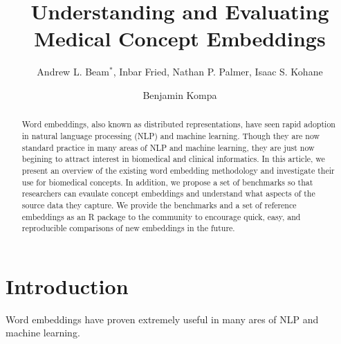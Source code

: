 \documentclass{ws-procs11x85}
\begin{document}
\title{Understanding and Evaluating Medical Concept Embeddings}

\author{Andrew L. Beam$^*$, Inbar Fried, Nathan P. Palmer, Isaac S. Kohane}

\address{Department of Biomedical Informatics, Harvard Medical School,\\
Boston, MA, 02115, USA\\
$^*$E-mail: Andrew\_Beam@hms.harvard.edu\\
www.university\_name.edu}

\author{Benjamin Kompa}

\address{University of North Carolina, Chapel Hill,\\
Chapel Hill, NC, 27514, USA\\
E-mail: kompa@live.unc.edu}

\begin{abstract}
Word embeddings, also known as distributed representations, have seen rapid adoption in natural language processing (NLP) and machine learning. Though they are now standard practice in many areas of NLP and machine learning, they are just now begining to attract interest in biomedical and clinical informatics. In this article, we present an overview of the existing word embedding methodology and investigate their use for biomedical concepts. In addition, we propose a set of benchmarks so that researchers can evaulate concept embeddings and understand what aspects of the source data they capture. We provide the benchmarks and a set of reference embeddings as an R package to the community to encourage quick, easy, and reproducible comparisons of new embeddings in the future.
\end{abstract}


\bodymatter

\section{Introduction}\label{aba:intro}
Word embeddings have proven extremely useful in many ares of NLP and machine learning. 
\end{document}
